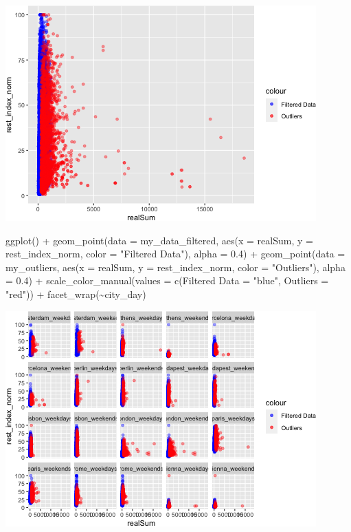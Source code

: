 \documentclass[
]{article}
\newenvironment{Shaded}{\begin{snugshade}}{\end{snugshade}}
\newcommand{\AttributeTok}[1]{\textcolor[rgb]{0.77,0.63,0.00}{#1}}
\newcommand{\FloatTok}[1]{\textcolor[rgb]{0.00,0.00,0.81}{#1}}
\newcommand{\FunctionTok}[1]{\textcolor[rgb]{0.00,0.00,0.00}{#1}}
\newcommand{\NormalTok}[1]{#1}
\newcommand{\OtherTok}[1]{\textcolor[rgb]{0.56,0.35,0.01}{#1}}
\newcommand{\SpecialCharTok}[1]{\textcolor[rgb]{0.00,0.00,0.00}{#1}}
\newcommand{\StringTok}[1]{\textcolor[rgb]{0.31,0.60,0.02}{#1}}
\begin{document}
\includegraphics{Project_files/figure-latex/unnamed-chunk-17-1.png}

\begin{Shaded}
\begin{Highlighting}[]
\FunctionTok{ggplot}\NormalTok{() }\SpecialCharTok{+} \FunctionTok{geom\_point}\NormalTok{(}\AttributeTok{data =}\NormalTok{ my\_data\_filtered, }\FunctionTok{aes}\NormalTok{(}\AttributeTok{x =}\NormalTok{ realSum,}
    \AttributeTok{y =}\NormalTok{ rest\_index\_norm, }\AttributeTok{color =} \StringTok{"Filtered Data"}\NormalTok{), }\AttributeTok{alpha =} \FloatTok{0.4}\NormalTok{) }\SpecialCharTok{+}
    \FunctionTok{geom\_point}\NormalTok{(}\AttributeTok{data =}\NormalTok{ my\_outliers, }\FunctionTok{aes}\NormalTok{(}\AttributeTok{x =}\NormalTok{ realSum, }\AttributeTok{y =}\NormalTok{ rest\_index\_norm,}
        \AttributeTok{color =} \StringTok{"Outliers"}\NormalTok{), }\AttributeTok{alpha =} \FloatTok{0.4}\NormalTok{) }\SpecialCharTok{+} \FunctionTok{scale\_color\_manual}\NormalTok{(}\AttributeTok{values =} \FunctionTok{c}\NormalTok{(}\StringTok{\textasciigrave{}}\AttributeTok{Filtered Data}\StringTok{\textasciigrave{}} \OtherTok{=} \StringTok{"blue"}\NormalTok{,}
    \AttributeTok{Outliers =} \StringTok{"red"}\NormalTok{)) }\SpecialCharTok{+} \FunctionTok{facet\_wrap}\NormalTok{(}\SpecialCharTok{\textasciitilde{}}\NormalTok{city\_day)}
\end{Highlighting}
\end{Shaded}

\includegraphics{Project_files/figure-latex/unnamed-chunk-17-2.png}
\end{document}
